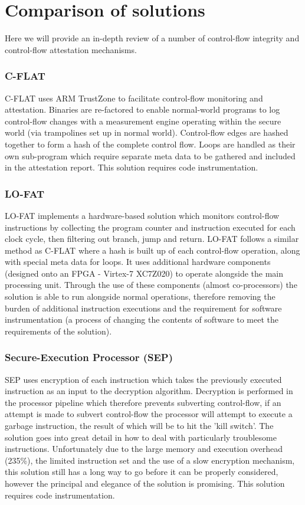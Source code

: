 \section{Comparison of solutions}

Here we will provide an in-depth review of a number of control-flow integrity and control-flow attestation mechanisms.

\subsubsection{C-FLAT}
C-FLAT \cite{Abera2016} uses ARM TrustZone to facilitate control-flow monitoring and attestation. Binaries are re-factored to enable normal-world programs to log control-flow changes with a measurement engine operating within the secure world (via trampolines set up in normal world). Control-flow edges are hashed together to form a hash of the complete control flow. Loops are handled as their own sub-program which require separate meta data to be gathered and included in the attestation report. This solution requires code instrumentation.

\subsubsection{LO-FAT}
LO-FAT \cite{Abera2016} implements a hardware-based solution which monitors control-flow instructions by collecting the program counter and instruction executed for each clock cycle, then filtering out branch, jump and return. LO-FAT follows a similar method as C-FLAT where a hash is built up of each control-flow operation, along with special meta data for loops. It uses additional hardware components (designed onto an FPGA - Virtex-7 XC7Z020) to operate alongside the main processing unit. Through the use of these components (almost co-processors) the solution is able to run alongside normal operations, therefore removing the burden of additional instruction executions and the requirement for software instrumentation (a process of changing the contents of software to meet the requirements of the solution).

\subsubsection{Secure-Execution Processor (SEP)}
SEP \cite{Lee2019} uses encryption of each instruction which takes the previously executed instruction as an input to the decryption algorithm. Decryption is performed in the processor pipeline which therefore prevents subverting control-flow, if an attempt is made to subvert control-flow the processor will attempt to execute a garbage instruction, the result of which will be to hit the 'kill switch'. The solution goes into great detail in how to deal with particularly troublesome instructions. Unfortunately due to the large memory and execution overhead (235\%), the limited instruction set and the use of a slow encryption mechanism, this solution still has a long way to go before it can be properly considered, however the principal and elegance of the solution is promising. This solution requires code instrumentation.

